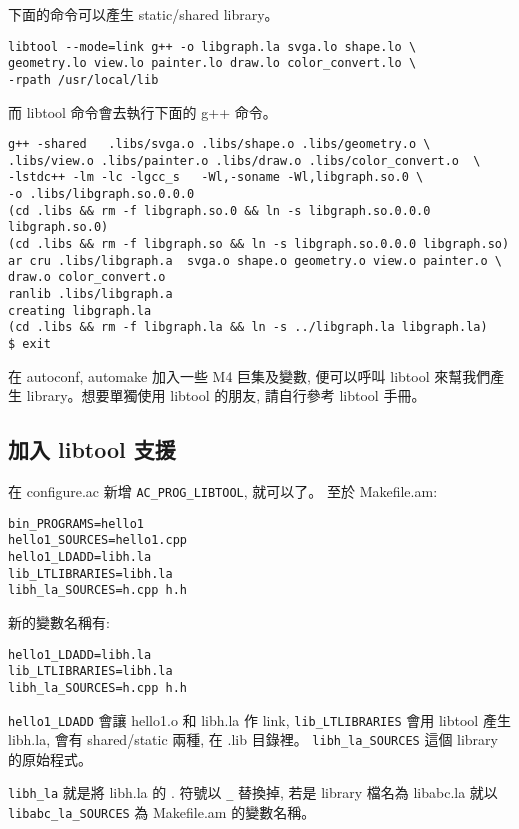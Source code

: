 \documentclass[12pt,a4]{article}
\begin{document}
\begin{CJK}{UTF8}{bsmi}
下面的命令可以產生 static/shared library。
\begin{verbatim}
libtool --mode=link g++ -o libgraph.la svga.lo shape.lo \
geometry.lo view.lo painter.lo draw.lo color_convert.lo \
-rpath /usr/local/lib
\end{verbatim}

而 libtool 命令會去執行下面的 g++ 命令。

\begin{verbatim}
g++ -shared   .libs/svga.o .libs/shape.o .libs/geometry.o \
.libs/view.o .libs/painter.o .libs/draw.o .libs/color_convert.o  \
-lstdc++ -lm -lc -lgcc_s   -Wl,-soname -Wl,libgraph.so.0 \
-o .libs/libgraph.so.0.0.0
(cd .libs && rm -f libgraph.so.0 && ln -s libgraph.so.0.0.0 libgraph.so.0)
(cd .libs && rm -f libgraph.so && ln -s libgraph.so.0.0.0 libgraph.so)
ar cru .libs/libgraph.a  svga.o shape.o geometry.o view.o painter.o \
draw.o color_convert.o
ranlib .libs/libgraph.a
creating libgraph.la
(cd .libs && rm -f libgraph.la && ln -s ../libgraph.la libgraph.la)
$ exit
\end{verbatim}

在 autoconf, automake 加入一些 M4 巨集及變數, 便可以呼叫 libtool 來幫我們產生
library。想要單獨使用 libtool 的朋友, 請自行參考 libtool 手冊。 

\subsection{加入 libtool 支援}
在 configure.ac 新增 \verb+AC_PROG_LIBTOOL+, 就可以了。
至於 Makefile.am:

\begin{verbatim}
bin_PROGRAMS=hello1
hello1_SOURCES=hello1.cpp
hello1_LDADD=libh.la
lib_LTLIBRARIES=libh.la
libh_la_SOURCES=h.cpp h.h
\end{verbatim}

新的變數名稱有:
\begin{verbatim}
hello1_LDADD=libh.la
lib_LTLIBRARIES=libh.la
libh_la_SOURCES=h.cpp h.h
\end{verbatim}

\verb+hello1_LDADD+ 會讓 hello1.o 和 libh.la 作 link,
\verb+lib_LTLIBRARIES+ 會用 libtool 產生 libh.la, 會有 shared/static 兩種,
在 .lib 目錄裡。
\verb+libh_la_SOURCES+ 這個 library 的原始程式。

\verb+libh_la+ 就是將 libh.la 的 . 符號以 \verb+_+ 替換掉,
若是 library 檔名為 libabc.la 就以 \verb+libabc_la_SOURCES+ 為 Makefile.am 的變數名稱。




\end{CJK}
\end{document}
